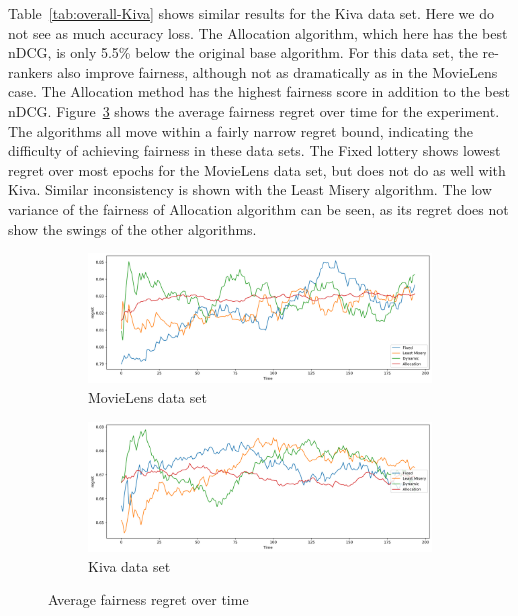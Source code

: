 Table~\ref{tab:overall-Kiva} shows similar results for the Kiva data set. Here we do not see as much accuracy loss. The Allocation algorithm, which here has the best nDCG, is only 5.5\% below the original base algorithm. For this data set, the re-rankers also improve fairness, although not as dramatically as in the MovieLens case. The Allocation method has the highest fairness score in addition to the best nDCG.
Figure~\ref{fig:local-regret} shows the average fairness regret over time for the experiment. The algorithms all move within a fairly narrow regret bound, indicating the difficulty of achieving fairness in these data sets. The Fixed lottery shows lowest regret over most epochs for the MovieLens data set, but does not do as well with Kiva. Similar inconsistency is shown with the Least Misery algorithm. The low variance of the fairness of Allocation algorithm can be seen, as its regret does not show the swings of the other algorithms.

\begin{figure}[tbh]
\setlength\tabcolsep{0pt}
    \begin{subfigure}{1.0\textwidth}
    \centering
    \includegraphics[width=4.5in]{imgs/dynfair/ml_avg_regret_overtime_sep20.png}
    \caption{MovieLens data set}
    \label{fig:local-regret-ML}
    \end{subfigure}
    \begin{subfigure}{1.0\textwidth}
    \centering
      \includegraphics[width=4.5in]{imgs/dynfair/kiva_avg_regret_overtime_sep20.png}
    \caption{Kiva data set}
    \label{fig:local-regret-Kiva}
    \end{subfigure}
    \caption{Average fairness regret over time}
    \label{fig:local-regret}
\end{figure}

